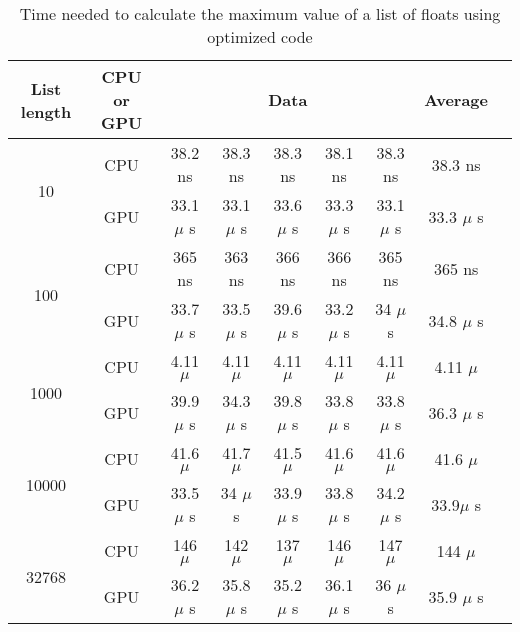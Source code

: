 \begin{table}[H]
  \caption{Time needed to calculate the maximum value of a list of floats using optimized code}
  \label{table:time}
  \begin{center}
	  \begin{tabular}{| c | c | c | c | c | c | c | c | c |}
	    \hline
	    List length & CPU or GPU & \multicolumn{5}{|c|}{Data} & Average\\
		  \hline
		  \multirow{2}{*}{10} & CPU & 38.2 ns & 38.3 ns & 38.3 ns & 38.1 ns & 38.3 ns & 38.3 ns\\ 
		  \cline{2-8}
		  & GPU & 33.1 $\mu$ s & 33.1 $\mu$ s & 33.6 $\mu$ s & 33.3 $\mu$ s & 33.1 $\mu$ s & 33.3 $\mu$ s\\ 
		  \hline
		  \multirow{2}{*}{100} & CPU & 365 ns & 363 ns & 366 ns & 366 ns & 365 ns & 365 ns\\ 
		  \cline{2-8}
		  & GPU & 33.7 $\mu$ s & 33.5 $\mu$ s & 39.6 $\mu$ s & 33.2 $\mu$ s & 34 $\mu$ s & 34.8 $\mu$ s\\ 
		  \hline
		  \multirow{2}{*}{1000} & CPU & 4.11 $\mu$ & 4.11 $\mu$ & 4.11 $\mu$ & 4.11 $\mu$ & 4.11 $\mu$ & 4.11 $\mu$ \\ 
		  \cline{2-8}
		  & GPU & 39.9 $\mu$ s & 34.3 $\mu$ s & 39.8 $\mu$ s & 33.8 $\mu$ s & 33.8 $\mu$ s & 36.3 $\mu$ s\\  
		  \hline
		  \multirow{2}{*}{10000} & CPU & 41.6 $\mu$ & 41.7 $\mu$ & 41.5 $\mu$ & 41.6 $\mu$ & 41.6 $\mu$ & 41.6 $\mu$ \\ 
		  \cline{2-8}
		  & GPU & 33.5 $\mu$ s & 34 $\mu$ s & 33.9 $\mu$ s & 33.8 $\mu$ s & 34.2 $\mu$ s & 33.9$\mu$ s\\  
		  \hline
		  \multirow{2}{*}{32768} & CPU & 146 $\mu$ & 142 $\mu$ & 137 $\mu$ & 146 $\mu$ & 147 $\mu$ & 144 $\mu$ \\ 
		  \cline{2-8}
		  & GPU & 36.2 $\mu$ s & 35.8 $\mu$ s & 35.2 $\mu$ s & 36.1 $\mu$ s & 36 $\mu$ s & 35.9 $\mu$ s\\
		  \hline
	  \end{tabular}
  \end{center}
\end{table}
